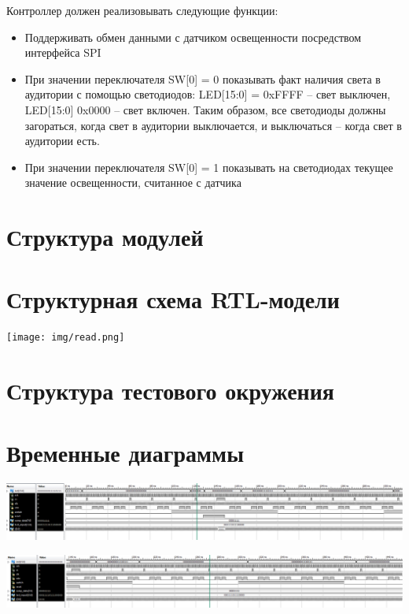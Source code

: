 

\usepackage{graphicx}
\fancyhead[LR]{}

\def \labnum {3}
\def \labsubj {Схемотехника ЭВМ}
\def \labauthor {Айтуганов Д. А. \\ Чебыкин И. Б.}
\def \labgroup {P3301}
\def \labinsp {Баевских А. Н.}
\def \labname {Вариант: 2}

\isnametrue
\lstset{
	caption=\lstname,
	basicstyle=\ttfamily\selectfont\scriptsize
}



\tableofcontents
\newpage
Контроллер должен реализовывать следующие функции:
\begin{itemize}
\item Поддерживать обмен данными с датчиком освещенности посредством интерфейса SPI
\item При значении переключателя SW[0] = 0 показывать факт наличия света в
аудитории с помощью светодиодов: LED[15:0] = 0xFFFF – свет выключен,
LED[15:0] 0x0000 – свет включен. Таким образом, все светодиоды должны
загораться, когда свет в аудитории выключается, и выключаться – когда свет в
аудитории есть.
\item При значении переключателя SW[0] = 1 показывать на светодиодах текущее
значение освещенности, считанное с датчика
\end{itemize}

\section{Структура модулей}




\section{Структурная схема RTL-модели}
\begin{centering}
\texttt{[image: img/read.png]}
\end{centering}

\section{Структура тестового окружения}


\section{Временные диаграммы}
\begin{centering}
\includegraphics[width=\textwidth]{img/graph1.png}

\includegraphics[width=\textwidth]{img/graph2.png}
\end{centering}

